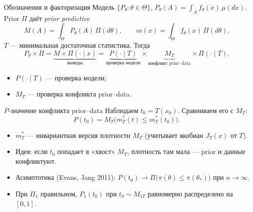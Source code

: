 \documentclass[aspectratio=169,10pt]{beamer}
\begin{document}
\begin{frame}{Обозначения и факторизация}
  Модель $\{P_\theta : \theta \in \Theta\}$, $P_\theta(A)=\int_A f_\theta(x)\,\mu(dx)$.
  Prior $\Pi$ даёт \emph{prior predictive}
  \[
    M(A)=\int_\Theta P_\theta(A)\,\Pi(d\theta),\qquad
    m(x)=\int_\Theta f_\theta(x)\,\Pi(d\theta).
  \]
  $T$ — минимальная достаточная статистика. Тогда
  \[
    P_\theta \times \Pi
      = \underbrace{M \times \Pi(\cdot\mid x)}_{\text{выводы}}
      = \underbrace{P(\cdot\mid T)}_{\text{проверка модели}}
        \times \underbrace{M_T}_{\text{конфликт prior--data}}
        \times \Pi(\cdot\mid T).
  \]
  \begin{itemize}
    \item $P(\cdot\mid T)$ — проверка модели;
    \item $M_T$ — проверка \alert{конфликта prior--data}.
  \end{itemize}
\end{frame}

\begin{frame}{$P$-значение конфликта prior--data}
  Наблюдаем $t_0 = T(x_0)$. Сравниваем его с $M_T$:
  \[
    P(t_0) = M_T\bigl(m_T^*(t) \le m_T^*(t_0)\bigr).
    \tag{2--3}
  \]
  \begin{itemize}
    \item $m_T^*$ — инвариантная версия плотности $M_T$
          (учитывает якобиан $J_T(x)$ от $T$).
    \item Идея: если $t_0$ попадает в «хвост» $M_T$, плотность там мала —
          prior и данные конфликтуют.
    \item Асимптотика (Evans, Jang 2011):
          $P(t_0)\to \Pi\bigl(\pi(\theta)\le \pi(\theta_*)\bigr)$ при $n\to\infty$.
    \item При $\Pi_1$ правильном, $P_1(t_0)$ при $t_0\sim M_{1T}$ \alert{равномерно распределено} на $[0,1]$.
  \end{itemize}
\end{frame}
\end{document}
